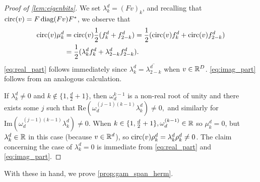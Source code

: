 \begin{proof}[Proof of \cref{lem:eigenbits}]
  We set $\lambda_k^d = (Fv)_k$, and recalling that $\operatorname{circ}(v) = F \operatorname{diag}(F v) F^*$, we observe that \begin{align*}\operatorname{circ}(v) \mu_k^d &= \operatorname{circ}(v) \frac{1}{2} (f_k^d + f_{2 - k}^d) = \frac{1}{2}(\operatorname{circ}(v) f_k^d + \operatorname{circ}(v) f_{2 - k}^d) \\ &= \frac{1}{2}(\lambda_k^d f_k^d + \lambda_{2 - k}^d f_{2 - k}^d).\end{align*}  \eqref{eq:real_part} follows immediately since $\lambda_k^d = \overline{\lambda_{2 - k}^d}$ when $v \in \mathbb{R}^D$.  \eqref{eq:imag_part} follows from an analogous calculation.

  If $\lambda_k^d \neq 0$ and $k \notin \{1, \frac{d}{2} + 1\}$, then $\omega_d^{k - 1}$ is a non-real root of unity and there exists some $j$ such that $\mathrm{Re}(\omega_d^{(j - 1)(k - 1)} \lambda_k^d) \neq 0,$ and similarly for $\mathrm{Im}(\omega_d^{(j - 1)(k - 1)} \lambda_k^d) \neq 0.$  When $k \in \{1, \frac{d}{2} + 1\}, \omega_d^{(k - 1)} \in \mathbb{R}$ so $\mu_k^d = 0$, but $\lambda_k^d \in \mathbb{R}$ in this case (because $v \in \mathbb{R}^d$), so $\operatorname{circ}(v) \rho_k^d = \lambda_k^d \rho_k^d \neq 0$.  The claim concerning the case of $\lambda_k^d = 0$ is immediate from \eqref{eq:real_part} and \eqref{eq:imag_part}.
\end{proof}

With these in hand, we prove \cref{prop:gam_span_herm}.

